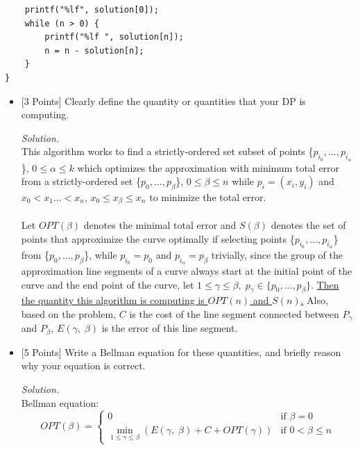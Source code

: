 \documentclass[10pt]{article}
\begin{document}
\begin{enumerate}
\begin{mdframed}
\begin{lstlisting}
    printf("%lf", solution[0]);
    while (n > 0) {
        printf("%lf ", solution[n]);
        n = n - solution[n];
    }
}
    \end{lstlisting}
    \end{mdframed}
    \begin{itemize}
        \item {[3 Points]} Clearly define the quantity or quantities that your DP is computing.
        \begin{mdframed}
            \textit{Solution.}\\
            This algorithm works to find a strictly-ordered set subset of points \{$p_{i_0}, ..., p_{i_{\alpha}}$\}, $0 \leq \alpha \leq k$ which optimizes the approximation with minimum total error from a strictly-ordered set \{$p_0, ..., p_{\beta}$\}, $0 \leq \beta \leq n$ while $p_i = (x_i, y_i)$ and $x_0 < x_1  ... < x_n$, $x_0 \leq x_{\beta} \leq x_n$ to minimize the total error.\\
            \\
            Let $OPT(\beta)$ denotes the minimal total error and $S(\beta)$ denotes the set of points that approximize the curve optimally if selecting points \{$p_{i_0}, ..., p_{i_{\alpha}}$\} from \{$p_0, ..., p_{\beta}$\}, while $p_{i_0} = p_0$ and $p_{i_{\alpha}} = p_{\beta}$ trivially, since the group of the approximation line segments of a curve always start at the initial point of the curve and the end point of the curve, let $1 \leq \gamma \leq \beta, \; p_{\gamma} \in \{p_0, ..., p_{\beta}\}$. \underline{Then the quantity this algorithm is computing is $OPT(n)$ and $S(n)$.} Also, based on the problem, $C$ is the cost of the line segment connected between $P_{\gamma}$ and $P_{\beta}$, $E(\gamma, \; \beta)$ is the error of this line segment.
        \end{mdframed}
        \item {[5 Points]} Write a Bellman equation for these quantities, and briefly reason why your equation is correct.
        \begin{mdframed}
            \textit{Solution.}\\
            Bellman equation:
            \begin{equation*}
              OPT(\beta) =
                \begin{cases}
                  0 & \text{if $\beta = 0$}\\
                  \min_{1 \leq \gamma \leq \beta}(E(\gamma, \; \beta) + C + OPT(\gamma)) & \text{if $0 < \beta \leq n$}
                \end{cases}       
           \end{equation*}
           

\end{mdframed}
\end{itemize}
\end{enumerate}
\end{document}
